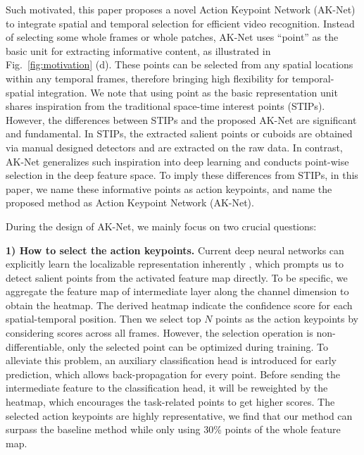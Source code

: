 \documentclass[journal]{IEEEtran}
\begin{document}
Such motivated, this paper proposes a novel Action Keypoint Network (AK-Net) to integrate spatial and temporal selection for efficient video recognition. Instead of selecting some whole frames or whole patches, AK-Net uses ``point'' as the basic unit for extracting informative content, as illustrated in Fig.~\ref{fig:motivation} (d). These points can be selected from any spatial locations within any temporal frames, therefore bringing high flexibility for temporal-spatial integration. 
We note that using point as the basic representation unit shares inspiration from the traditional space-time interest points (STIPs). However, the differences between STIPs and the proposed AK-Net are significant and fundamental. In STIPs, the extracted salient points \cite{bregonzio2009recognising} or cuboids \cite{dollar2005behavior} are obtained via manual designed detectors and are extracted on the raw data. In contrast, AK-Net generalizes such inspiration into deep learning and conducts point-wise selection in the deep feature space. To imply these differences from STIPs, in this paper, we name these informative points as action keypoints, and name the proposed method as Action Keypoint Network (AK-Net). 

During the design of AK-Net, we mainly focus on two crucial questions:

\textbf{1) How to select the action keypoints.}
Current deep neural networks can explicitly learn the localizable representation inherently \cite{zhou2016learning, selvaraju2017grad}, which prompts us to detect salient points from the activated feature map directly.
To be specific, we aggregate the feature map of intermediate layer along the channel dimension to obtain the heatmap.
The derived heatmap indicate the confidence score for each spatial-temporal position.
Then we select top $N$ points as the action keypoints by considering scores across all frames.
However, the selection operation is non-differentiable, only the selected point can be optimized during training.
To alleviate this problem, an auxiliary classification head is introduced for early prediction, which allows back-propagation for every point.
Before sending the intermediate feature to the classification head, it will be reweighted by the heatmap, which encourages the task-related points to get higher scores.
The selected action keypoints are highly representative, we find that our method can surpass the baseline method while only using 30\% points of the whole feature map.
\end{document}
